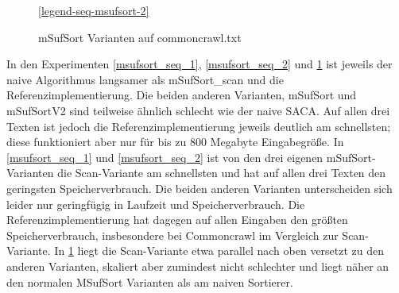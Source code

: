 \begin{figure}[ht]

    \medskip
    \ref{legend-seq-msufsort-2}
    \caption{mSufSort Varianten auf commoncrawl.txt}
	\label{msufsort_seq_3}
\end{figure}
\FloatBarrier

In den Experimenten \ref{msufsort_seq_1}, \ref{msufsort_seq_2} und \ref{msufsort_seq_3} ist jeweils der naive Algorithmus langsamer als mSufSort_scan und die Referenzimplementierung. Die beiden anderen Varianten, mSufSort und mSufSortV2 sind teilweise ähnlich schlecht wie der naive SACA. Auf allen drei Texten ist jedoch die Referenzimplementierung jeweils deutlich am schnellsten; diese funktioniert aber nur für bis zu 800 Megabyte Eingabegröße. In \ref{msufsort_seq_1} und \ref{msufsort_seq_2} ist von den drei eigenen mSufSort-Varianten die Scan-Variante am schnellsten und hat auf allen drei Texten den geringsten Speicherverbrauch.
Die beiden anderen Varianten unterscheiden sich leider nur geringfügig in Laufzeit und Speicherverbrauch. Die Referenzimplementierung hat dagegen auf allen Eingaben den größten Speicherverbrauch, insbesondere bei Commoncrawl im Vergleich zur Scan-Variante.
In \ref{msufsort_seq_3} liegt die Scan-Variante etwa parallel nach oben versetzt zu den anderen Varianten,
skaliert aber zumindest nicht schlechter und liegt näher an den normalen MSufSort Varianten als am naiven Sortierer.
